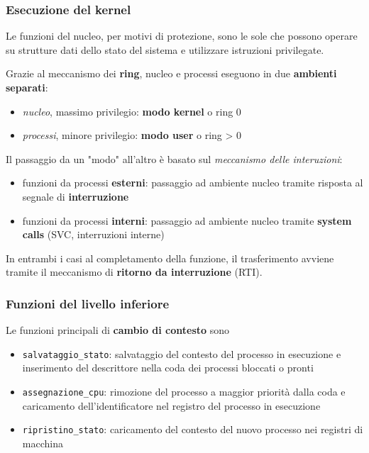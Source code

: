 \subsubsection{Esecuzione del kernel}
Le funzioni del nucleo, per motivi di protezione, sono le sole che possono operare su strutture dati dello stato del sistema e utilizzare istruzioni privilegate.

Grazie al meccanismo dei \textbf{ring}, nucleo e processi eseguono in due \textbf{ambienti separati}:
\begin{itemize}
    \item \textit{nucleo}, massimo privilegio: \textbf{modo kernel} o ring 0
    \item \textit{processi}, minore privilegio: \textbf{modo user} o ring > 0
\end{itemize}

Il passaggio da un "modo" all'altro è basato sul \textit{meccanismo delle interuzioni}:
\begin{itemize}
    \item funzioni da processi \textbf{esterni}: passaggio ad ambiente nucleo tramite risposta al segnale di \textbf{interruzione}
    \item funzioni da processi \textbf{interni}: passaggio ad ambiente nucleo tramite \textbf{system calls} (SVC, interruzioni interne)
\end{itemize}

In entrambi i casi al completamento della funzione, il trasferimento avviene tramite il meccanismo di \textbf{ritorno da interruzione} (RTI).

\subsubsection{Funzioni del livello inferiore}
Le funzioni principali di \textbf{cambio di contesto} sono
\begin{itemize}
    \item \texttt{salvataggio\_stato}: salvataggio del contesto del processo in esecuzione e inserimento del descrittore nella coda dei processi bloccati o pronti
    \item \texttt{assegnazione\_cpu}: rimozione del processo a maggior priorità dalla coda e caricamento dell'identificatore nel registro del processo in esecuzione
    \item \texttt{ripristino\_stato}: caricamento del contesto del nuovo processo nei registri di macchina
\end{itemize}

